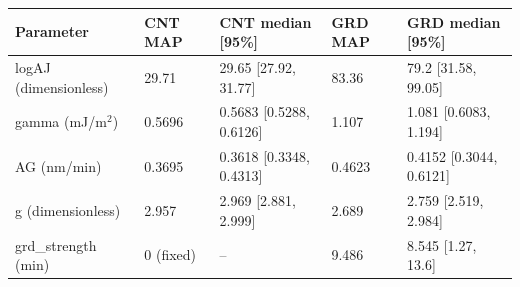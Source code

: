 \begin{tabular}{lllll}
\hline
Parameter & CNT MAP & CNT median [95\%] & GRD MAP & GRD median [95\%] \\
\hline
logAJ (dimensionless) & 29.71 & 29.65 [27.92, 31.77] & 83.36 & 79.2 [31.58, 99.05] \\
gamma (mJ/m$^2$) & 0.5696 & 0.5683 [0.5288, 0.6126] & 1.107 & 1.081 [0.6083, 1.194] \\
AG (nm/min) & 0.3695 & 0.3618 [0.3348, 0.4313] & 0.4623 & 0.4152 [0.3044, 0.6121] \\
g (dimensionless) & 2.957 & 2.969 [2.881, 2.999] & 2.689 & 2.759 [2.519, 2.984] \\
grd\_strength (min) & 0 (fixed) & -- & 9.486 & 8.545 [1.27, 13.6] \\
\hline
\end{tabular}
